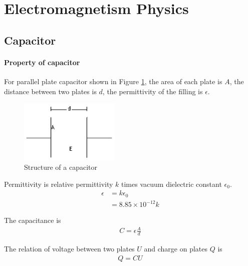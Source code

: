 \section{Electromagnetism Physics}
    \subsection{Capacitor}
        \paragraph{Property of capacitor}
            For parallel plate capacitor shown in Figure \ref{capa_struct}, the area of each plate is $A$, the distance between two plates is $d$, the permittivity of the filling is $\epsilon$.
            \begin{figure}[H]
                \begin{center}
                    \includegraphics[height=3cm]{electromagnetism_charts/capa_struct.eps}
                \end{center}
                \caption{Structure of a capacitor}
                \label{capa_struct}
            \end{figure}

            Permittivity is relative permittivity $k$ times vacuum dielectric constant $\epsilon_0$.
            \begin{align}
                \epsilon &= k \epsilon_0 \\
                         &= 8.85 \times 10^{-12} k
            \end{align}

            The capacitance is
            \begin{align}
                C = \epsilon \frac{A}{d}
            \end{align}

            The relation of voltage between two plates $U$ and charge on plates $Q$ is
            \begin{align}
                Q = C U
            \end{align}

